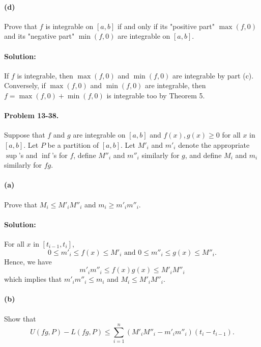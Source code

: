 \documentclass{article}
\begin{document}
\paragraph{(d)} Prove that $f$ is integrable on $[a, b]$ if and only if its
"positive part" $\max(f, 0)$ and its "negative part" $\min(f, 0)$ are
integrable on $[a, b]$.

\paragraph{Solution:} If $f$ is integrable, then $\max(f, 0)$ and $\min(f, 0)$
are integrable by part (c). Conversely, if $\max(f, 0)$ and $\min(f, 0)$ are
integrable, then $f = \max(f, 0) + \min(f, 0)$ is integrable too by Theorem 5.

\paragraph{Problem 13-38.} Suppose that $f$ and $g$ are integrable on $[a, b]$
and $f(x), g(x) \geq 0$ for all $x$ in $[a, b]$. Let $P$ be a partition of $[a,
b]$. Let $M'_i$ and $m'_i$ denote the appropriate $\sup$'s and $\inf$'s for
$f$, define $M''_i$ and $m''_i$ similarly for $g$, and define $M_i$ and $m_i$
similarly for $fg$.

\paragraph{(a)} Prove that $M_i \leq M'_iM''_i$ and $m_i \geq m'_im''_i$.

\paragraph{Solution:} For all $x$ in $[t_{i - 1}, t_i]$, \begin{equation*}
  0 \leq m'_i \leq f(x) \leq M'_i \text{ and } 0 \leq m''_i \leq g(x) \leq
    M''_i.
\end{equation*} Hence, we have \begin{equation*}
  m'_im''_i \leq f(x)g(x) \leq M'_iM''_i
\end{equation*} which implies that $m'_im''_i \leq m_i$ and $M_i \leq
M'_iM''_i$.

\paragraph{(b)} Show that \begin{equation*}
  U(fg, P) - L(fg, P) \leq \sum_{i = 1}^n (M'_iM''_i - m'_im''_i)(t_i -
    t_{i - 1}).
\end{equation*}
\end{document}

